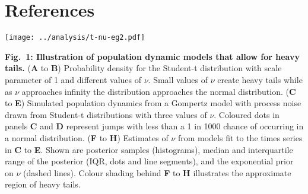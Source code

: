 \section{References}

\renewcommand{\section}[2]{}%





\clearpage


\begin{center}
\texttt{[image: ../analysis/t-nu-eg2.pdf]}
\end{center}

\textbf{Fig.~1: Illustration of population dynamic models that allow for heavy
tails.} (\textbf{A} to \textbf{B}) Probability density for the Student-t
distribution with scale parameter of 1 and different values of \(\nu\). Small
values of \(\nu\) create heavy tails while as \(\nu\) approaches infinity the
distribution approaches the normal distribution. (\textbf{C} to \textbf{E})
Simulated population dynamics from a Gompertz model with process noise drawn
from Student-t distributions with three values of \(\nu\). Coloured dots in
panels \textbf{C} and \textbf{D} represent jumps with less than a 1 in 1000
chance of occurring in a normal distribution. (\textbf{F} to \textbf{H})
Estimates of \(\nu\) from models fit to the times series in \textbf{C} to
\textbf{E}. Shown are posterior samples (histograms), median and interquartile
range of the posterior (IQR, dots and line segments), and the exponential prior
on \(\nu\) (dashed lines). Colour shading behind \textbf{F} to \textbf{H}
illustrates the approximate region of heavy tails.

